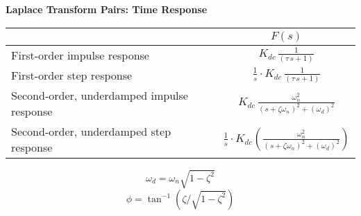\documentclass[10pt]{article}
\begin{document}
\centerline{\large {\bf Laplace Transform Pairs: Time Response}}
\vspace{1ex}

\begin{table}[hbt]\center
\begin{tabular}{|p{2in}|c|c|} \hline
	& \mbox{\rule[-1ex]{0cm}{4ex}  $f(t)$} & $F(s)$ \\ \hline \hline
  First-order impulse response	& \mbox{\rule[-2ex]{0cm}{5ex}
    $\frac{K_{dc}}{\tau} \left( {e}^{t/\tau} \right)$ } & $K_{dc} \, \frac{1}{(\tau \, s + 1)}$ \\ \hline
  First-order step response	& \mbox{\rule[-2ex]{0cm}{5ex}
    $K_{dc} \left( 1 - {e}^{t/\tau} \right)$ } & $\frac{1}{s} \cdot K_{dc} \, \frac{1}{(\tau \, s + 1)}$ \\ \hline
  Second-order, underdamped impulse response	& \mbox{\rule[-2ex]{0cm}{5ex}
    $K_{DC} \left(\frac{\omega_n}{\sqrt{1-\zeta^2}}\right) \left( e^{-\zeta \omega_n t} \right)  \sin(\omega_{d} t ) $
  } & $ K_{dc} \, \frac{\omega_n^2}{(s+\zeta \omega_n)^2 + (\omega_d)^2}$ \\ \hline
    Second-order, underdamped step response	& \mbox{\rule[-2ex]{0cm}{5ex}
    $K_{DC} \left( 1 -  \left(\frac{1}{\sqrt{1-\zeta^2}}\right) \left( e^{-\zeta \omega_n t} \right)  \cos(\omega_{d} t + \phi ) \right) $
  } & $ \frac{1}{s} \cdot  K_{dc} \left( \frac{\omega_n^2}{(s+\zeta \omega_n)^2 + (\omega_d)^2} \right)$ \\ \hline
    
\end{tabular}
\label{t:bayes.note}
\end{table}

\[
\omega_d = \omega_n \sqrt{1-\zeta^2}
\]
\[
\phi = \tan^{-1}(\zeta/\sqrt{1-\zeta^2})
\]
\end{document}
